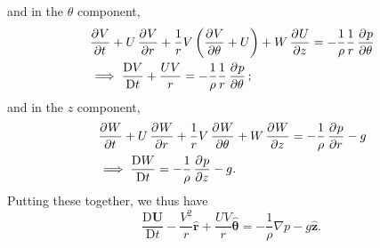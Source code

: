 \documentclass{article}
\def\*#1{\mathbf{#1}}
\newcommand{\rhat}{\mathbf{\hat{r}}}
\newcommand{\thetahat}{\boldsymbol{\hat{\theta}}}
\newcommand{\zhat}{\mathbf{\hat{z}}}
\newcommand{\dadvd}[2]{\dfrac{\text{D} #1}{\text{D} #2}} %
\begin{document}
%
and in the $\theta$ component,
%
\begin{align*}
    &\dpd{V}{t}
    + U \dpd{V}{r}
    + \frac{1}{r} V \del{\dpd{V}{\theta} + U}
    + W \dpd{U}{z}
    =
    - \frac{1}{\rho} \frac{1}{r} \dpd{p}{\theta}
    \\
    &\implies
    \dadvd{V}{t} + \frac{U V}{r}
    =
    - \frac{1}{\rho} \frac{1}{r} \dpd{p}{\theta}
    ;
\end{align*}
%
and in the $z$ component,
%
\begin{align*}
    &\dpd{W}{t}
    + U \dpd{W}{r}
    + \frac{1}{r} V \dpd{W}{\theta}
    + W \dpd{W}{z}
    =
    - \frac{1}{\rho} \dpd{p}{r} - g
    \\
    &\implies
    \dadvd{W}{t}
    =
    - \frac{1}{\rho} \dpd{p}{z} - g
    .
\end{align*}
%
Putting these together, we thus have
%
\begin{equation*}
    \dadvd{\*U}{t} - \frac{V^2}{r} \rhat + \frac{U V}{r} \thetahat
        = - \frac{1}{\rho} \nabla p - g \zhat
    .
\end{equation*}
\end{document}
